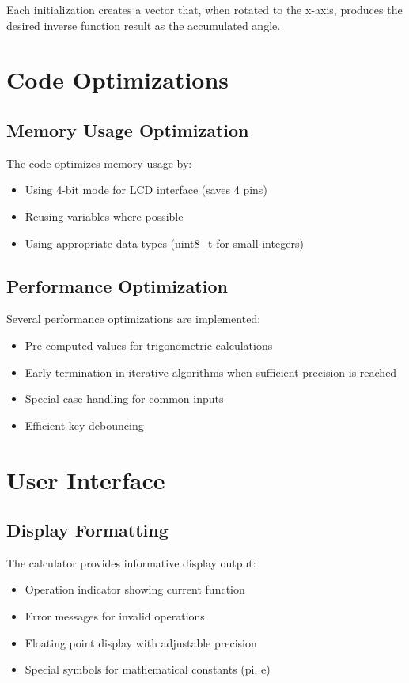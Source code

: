 \documentclass[12pt]{article}
\begin{document}
Each initialization creates a vector that, when rotated to the x-axis, produces the desired inverse function result as the accumulated angle.
\section{Code Optimizations}
\subsection{Memory Usage Optimization}
The code optimizes memory usage by:
\begin{itemize}
\item Using 4-bit mode for LCD interface (saves 4 pins)
\item Reusing variables where possible
\item Using appropriate data types (uint8\_t for small integers)
\end{itemize}
\subsection{Performance Optimization}
Several performance optimizations are implemented:
\begin{itemize}
\item Pre-computed values for trigonometric calculations
\item Early termination in iterative algorithms when sufficient precision is reached
\item Special case handling for common inputs
\item Efficient key debouncing
\end{itemize}
\section{User Interface}
\subsection{Display Formatting}
The calculator provides informative display output:
\begin{itemize}
\item Operation indicator showing current function
\item Error messages for invalid operations
\item Floating point display with adjustable precision
\item Special symbols for mathematical constants (pi, e)
\end{itemize}
\end{document}
